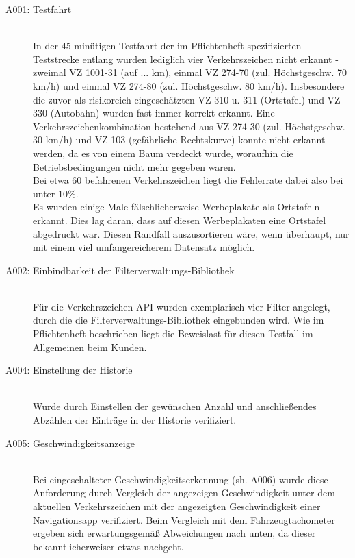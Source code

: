 \documentclass[12pt,a4paper,ngerman,enabledeprecatedfontcommands]{scrreprt}
\begin{document}
\begin{description}

    \item[A001: Testfahrt]~\\ In der 45-minütigen Testfahrt der im Pflichtenheft spezifizierten Teststrecke entlang wurden lediglich vier Verkehrszeichen nicht erkannt - zweimal \gls{VZ} 1001-31 (auf ... km), einmal \gls{VZ} 274-70 (zul. Höchstgeschw. 70 km/h) und einmal \gls{VZ} 274-80 (zul. Höchstgeschw. 80 km/h). Insbesondere die zuvor als risikoreich eingeschätzten \gls{VZ} 310 u. 311 (Ortstafel) und \gls{VZ} 330 (Autobahn) wurden fast immer korrekt erkannt. Eine \gls{Verkehrszeichenkombination} bestehend aus \gls{VZ} 274-30 (zul. Höchstgeschw. 30 km/h) und \gls{VZ} 103 (gefährliche Rechtskurve) konnte nicht erkannt werden, da es von einem Baum verdeckt wurde, woraufhin die Betriebsbedingungen nicht mehr gegeben waren.\\
    Bei etwa 60 befahrenen Verkehrszeichen liegt die Fehlerrate dabei also bei unter 10\%.\\
    Es wurden einige Male fälschlicherweise Werbeplakate als Ortstafeln erkannt. Dies lag daran, dass auf diesen Werbeplakaten eine Ortstafel abgedruckt war. Diesen Randfall auszusortieren wäre, wenn überhaupt, nur mit einem viel umfangereicherem Datensatz möglich.
    
    \item[A002: Einbindbarkeit der \gls{Filterverwaltungs-Bibliothek}]~\\ Für die \gls{Verkehrszeichen-API} wurden exemplarisch vier Filter angelegt, durch die die \gls{Filterverwaltungs-Bibliothek} eingebunden wird. Wie im Pflichtenheft beschrieben liegt die Beweislast für diesen Testfall im Allgemeinen beim Kunden.
    
    \item[A004: Einstellung der Historie]~\\ Wurde durch Einstellen der gewünschen Anzahl und anschließendes Abzählen der Einträge in der Historie verifiziert.
    
    \item[A005: Geschwindigkeitsanzeige]~\\ Bei eingeschalteter Geschwindigkeitserkennung (sh. A006) wurde diese Anforderung durch Vergleich der angezeigen Geschwindigkeit unter dem aktuellen Verkehrszeichen mit der angezeigten Geschwindigkeit einer Navigationsapp verifiziert. Beim Vergleich mit dem Fahrzeugtachometer ergeben sich erwartungsgemäß Abweichungen nach unten, da dieser bekanntlicherweiser etwas \glqq{}nachgeht\grqq{}.


\end{description}
\end{document}

